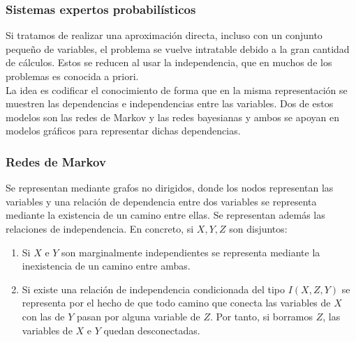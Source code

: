 \documentclass[leqno]{beamer}
\begin{document}
\begin{frame}
\frametitle{Sistemas expertos probabilísticos}
Si tratamos de realizar una aproximación directa, incluso con un conjunto pequeño de variables, el problema se vuelve intratable debido a la gran cantidad de cálculos. Estos se reducen al usar la independencia, que en muchos de los problemas es conocida a priori. \\
La idea es codificar el conocimiento de forma que en la misma representación se muestren las dependencias e independencias entre las variables. Dos de estos modelos son las redes de Markov y las redes bayesianas y ambos se apoyan en modelos gráficos para representar dichas dependencias.
\end{frame}

\begin{frame}
\frametitle{Redes de Markov}
Se representan mediante grafos no dirigidos, donde los nodos representan las variables y una relación de dependencia entre dos variables se representa mediante la existencia de un camino entre ellas. Se representan además las relaciones de independencia. En concreto, si $X,Y,Z$ son disjuntos:
\begin{enumerate}
\item Si $X$ e $Y$ son marginalmente independientes se representa mediante la inexistencia de un camino entre ambas.
\item Si existe una relación de independencia condicionada del tipo $I(X,Z,Y)$ se representa por el hecho de que todo camino que conecta las variables de $X$ con las de $Y$ pasan por alguna variable de $Z$. Por tanto, si borramos $Z$, las variables de $X$ e $Y$ quedan desconectadas.
\end{enumerate}
\end{frame}
\end{document}
